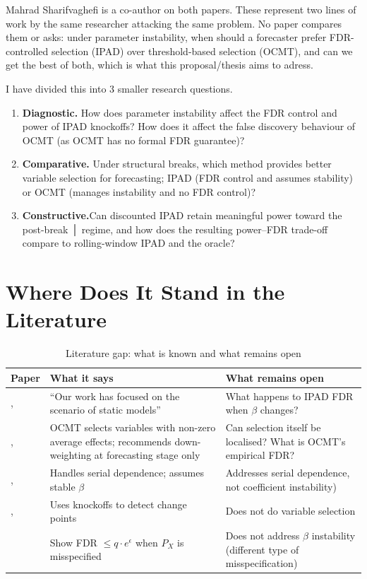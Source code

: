 \documentclass[12pt, a4paper]{article}
\begin{document}
Mahrad Sharifvaghefi is a co-author on both papers. These represent two lines of work by
the same researcher attacking the same problem. No paper compares them or asks: under
parameter instability, when should a forecaster prefer FDR-controlled selection (IPAD)
over threshold-based selection (OCMT), and can we get the best of both, which is what this proposal/thesis aims to adress.

I have divided this into 3 smaller research questions.

\newpage
\begin{enumerate}[leftmargin=*, label=\textbf{RQ\arabic*.}, itemsep=6pt]
    \item \textbf{Diagnostic.} How does parameter instability affect the FDR control and power of IPAD knockoffs? How does it affect the false discovery behaviour of OCMT (as OCMT has no formal FDR guarantee)?

    \item \textbf{Comparative.} Under structural breaks, which method provides better variable selection for forecasting; IPAD (FDR control and assumes stability) or OCMT (manages instability and no FDR control)?

    \item \textbf{Constructive.}Can discounted IPAD retain meaningful power toward the post-break
 │ regime, and how does the resulting power–FDR trade-off compare to rolling-window IPAD and the oracle?
\end{enumerate}


\section{Where Does It Stand in the Literature}

\begin{table}[H]
\centering
\caption{Literature gap: what is known and what remains open}
\label{tab:gap}
\small
\begin{tabular}{L{3.5cm} L{4.8cm} L{5cm}}
\toprule
Paper & What it says & \textbf{What remains open} \\
\midrule
\citet{fan2020ipad}, & ``Our work has focused on the scenario of static models'' & What happens to IPAD FDR when $\beta$ changes? \\[4pt]
\citet{chudik2024ocmt},  & OCMT selects variables with non-zero average effects; recommends down-weighting at forecasting stage only & Can selection itself be localised? What is OCMT's empirical FDR? \\[4pt]
\citet{chi2025},  & Handles serial dependence; assumes stable $\beta$ & Addresses serial dependence, not coefficient instability) \\[4pt]
\citet{liu2024},  & Uses knockoffs to detect change points & Does not do variable selection \\[4pt]
\citet{barber2020} & Show  FDR $\leq q \cdot e^\epsilon$ when $P_X$ is misspecified & Does not address $\beta$ instability (different type of misspecification) \\
\bottomrule
\end{tabular}
\end{table}
\end{document}

